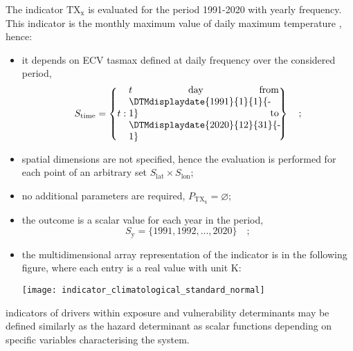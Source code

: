 \begin{example}
  The \gls{indicator} $\mathrm{TX_x}$ is evaluated for the period 1991-2020 with yearly frequency. This \gls{indicator} is the monthly maximum value of daily maximum temperature \cite{ETCCDIClimate}, hence:
  \begin{itemize}
    \item it depends on \gls{ECV} \glsdesc{tasmax} defined at daily frequency over the considered period,
      \begin{equation*}
        S_\text{time} = \left\{ t : \parbox{0.45\linewidth}{$t$ day from \DTMdisplaydate{1991}{1}{1}{-1} to \DTMdisplaydate{2020}{12}{31}{-1}} \right\}
        \quad ;
      \end{equation*}
    \item spatial dimensions are not specified, hence the evaluation is performed for each point of an arbitrary set $S_\text{lat} \times S_\text{lon}$;
    \item no additional parameters are required, $P_\mathrm{TX_x} = \varnothing$;
    \item the outcome is a scalar value for each year in the period,
      \begin{equation*}
        S_\text{y} = \{ 1991, 1992, \dots, 2020 \}
        \quad ;
      \end{equation*}
    \item the multidimensional array representation of the \gls{indicator} is in the following figure, where each entry is a real value with unit \unit{\kelvin}:
      \begin{center}
        \texttt{[image: indicator\_climatological\_standard\_normal]}
      \end{center}
  \end{itemize}
\end{example}

\Glspl{indicator} of \glspl{driver} within \gls{exposure} and \gls{vulnerability} \glspl{determinant} may be defined similarly as the \gls{hazard} \gls{determinant} as scalar functions depending on specific variables characterising the system.
